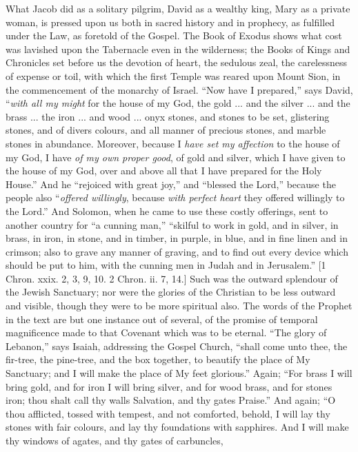 What Jacob did as a solitary pilgrim, David as a wealthy king, Mary
as a private woman, is pressed upon us both in sacred history and in
prophecy, as fulfilled under the Law, as foretold of the Gospel. The
Book of Exodus shows what cost was lavished upon the Tabernacle even
in the wilderness; the Books of Kings and Chronicles set before us the
devotion of heart, the sedulous zeal, the carelessness of expense or
toil, with which the first Temple was reared upon Mount Sion, in the
commencement of the monarchy of Israel. ``Now have I
prepared,'' says David, ``\emph{with all my might} for the
house of my God, the gold ... and the silver ... and the brass ... the
iron ... and wood ... onyx stones, and stones to be set, glistering
stones, and of divers colours, and all manner of precious stones, and
marble stones in abundance. Moreover, because I \emph{have set my
affection} to the house of my God, I have \emph{of my own proper good},
of gold and silver, which I have given to the house of my God, over
and above all that I have prepared for the Holy House.'' And he
``rejoiced with great joy,'' and ``blessed the Lord,''
because the people also ``\emph{offered willingly}, because \emph{with
perfect heart} they offered willingly to the Lord.'' And
Solomon, when he came to use these costly offerings, sent to another
country for ``a cunning man,'' ``skilful to work in gold,
and in silver, in brass, in iron, in stone, and in timber, in purple,
in blue, and in fine linen and in crimson; also to grave any manner of
graving, and to find out every device which should be put to him, with
the cunning men in Judah and in Jerusalem.'' [1 Chron. xxix. 2, 3,
9, 10. 2 Chron. ii. 7, 14.] Such was the outward splendour of the
Jewish Sanctuary; nor were the glories of the Christian to be less
outward and visible, though they were to be more spiritual also. The
words of the Prophet in the text are but one instance out of several,
of the promise of temporal magnificence made to that Covenant which
was to be eternal. ``The glory of Lebanon,'' says Isaiah,
addressing the Gospel Church, ``shall come unto thee, the
fir-tree, the pine-tree, and the box together, to beautify the place
of My Sanctuary; and I will make the place of My feet glorious.''
Again; ``For brass I will bring gold, and for iron I will bring
silver, and for wood brass, and for stones iron; thou shalt call thy
walls Salvation, and thy gates Praise.'' And again; ``O thou
afflicted, tossed with tempest, and not comforted, behold, I will lay
thy stones with fair colours, and lay thy foundations with sapphires.
And I will make thy windows of agates, and thy gates of carbuncles,
